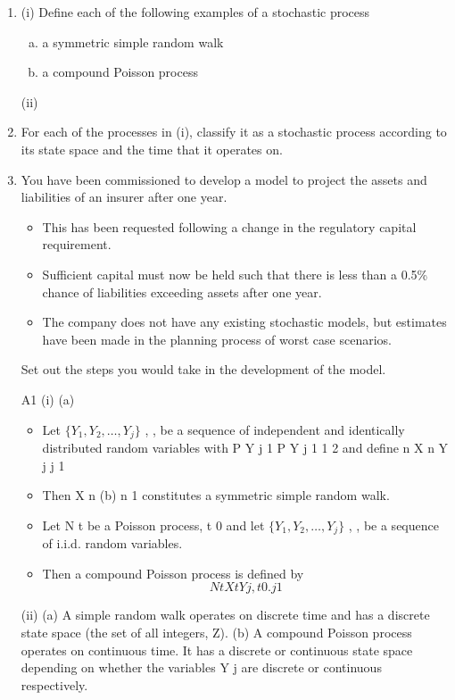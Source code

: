 \documentclass[a4paper,12pt]{article}
\begin{document}
\begin{enumerate}
\item 
(i)
Define each of the following examples of a stochastic process

\begin{enumerate}[(a)]
\item a symmetric simple random walk
\item a compound Poisson process
\end{enumerate}
(ii)
\item %
For each of the processes in (i), classify it as a stochastic process according to its state space and the time that it operates on.
\item 
You have been commissioned to develop a model to project the assets and liabilities of an insurer after one year. 
\begin{itemize}
    \item This has been requested following a change in the regulatory capital requirement. 
    \item Sufficient capital must now be held such that there is
less than a 0.5\% chance of liabilities exceeding assets after one year.
\item The company does not have any existing stochastic models, but estimates have been made in the planning process of worst case scenarios.
\end{itemize}
Set out the steps you would take in the development of the model.

A1
(i)
(a)
\begin{itemize}
    \item Let $\{Y_1 , Y_2 , \ldots , Y_j\}$ , , be a sequence of independent and identically
distributed random variables with
P Y j
1
P Y j
1
1
2
and define
n
X n
Y j
j 1
\item Then X n
(b)
n 1
constitutes a symmetric simple random walk.
\item Let N t be a Poisson process, t 0 and let $\{Y_1 , Y_2 , \ldots , Y_j\}$ , , be a sequence of i.i.d. random variables. 
\item Then a compound Poisson process is defined by
\[N t
X t
Y j ,
t
0.
j 1\]
\end{itemize}

(ii)
(a) A simple random walk operates on discrete time and has a discrete state space (the set of all integers, Z).
(b) A compound Poisson process operates on continuous time.
It has a discrete or continuous state space depending on whether the variables Y j are discrete or continuous respectively.


\end{enumerate}
\end{document}

